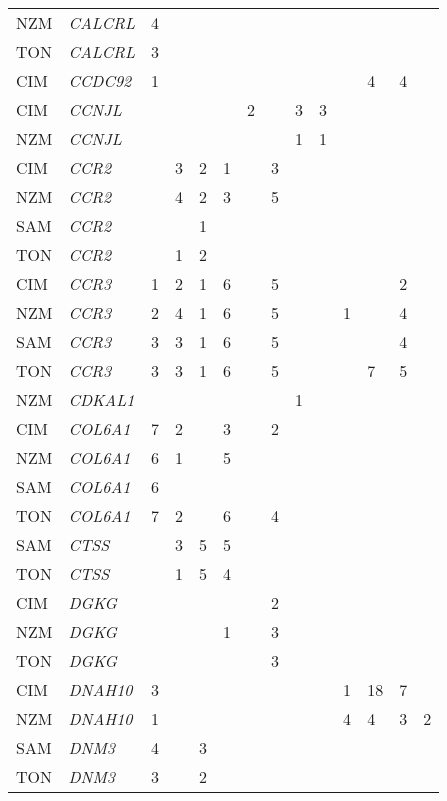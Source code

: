 \documentclass[]{report}
\begin{document}
\begin{ThreePartTable}
\begin{longtable}[t]{llllllllllllll}
NZM & \em{CALCRL} & 4 &  &  &  &  &  &  &  &  &  &  & \\
TON & \em{CALCRL} & 3 &  &  &  &  &  &  &  &  &  &  & \\
CIM & \em{CCDC92} & 1 &  &  &  &  &  &  &  &  & 4 & 4 & \\
CIM & \em{CCNJL} &  &  &  &  & 2 &  & 3 & 3 &  &  &  & \\
NZM & \em{CCNJL} &  &  &  &  &  &  & 1 & 1 &  &  &  & \\
CIM & \em{CCR2} &  & 3 & 2 & 1 &  & 3 &  &  &  &  &  & \\
NZM & \em{CCR2} &  & 4 & 2 & 3 &  & 5 &  &  &  &  &  & \\
SAM & \em{CCR2} &  &  & 1 &  &  &  &  &  &  &  &  & \\
TON & \em{CCR2} &  & 1 & 2 &  &  &  &  &  &  &  &  & \\
CIM & \em{CCR3} & 1 & 2 & 1 & 6 &  & 5 &  &  &  &  & 2 & \\
NZM & \em{CCR3} & 2 & 4 & 1 & 6 &  & 5 &  &  & 1 &  & 4 & \\
SAM & \em{CCR3} & 3 & 3 & 1 & 6 &  & 5 &  &  &  &  & 4 & \\
TON & \em{CCR3} & 3 & 3 & 1 & 6 &  & 5 &  &  &  & 7 & 5 & \\
NZM & \em{CDKAL1} &  &  &  &  &  &  & 1 &  &  &  &  & \\
CIM & \em{COL6A1} & 7 & 2 &  & 3 &  & 2 &  &  &  &  &  & \\
NZM & \em{COL6A1} & 6 & 1 &  & 5 &  &  &  &  &  &  &  & \\
SAM & \em{COL6A1} & 6 &  &  &  &  &  &  &  &  &  &  & \\
TON & \em{COL6A1} & 7 & 2 &  & 6 &  & 4 &  &  &  &  &  & \\
SAM & \em{CTSS} &  & 3 & 5 & 5 &  &  &  &  &  &  &  & \\
TON & \em{CTSS} &  & 1 & 5 & 4 &  &  &  &  &  &  &  & \\
CIM & \em{DGKG} &  &  &  &  &  & 2 &  &  &  &  &  & \\
NZM & \em{DGKG} &  &  &  & 1 &  & 3 &  &  &  &  &  & \\
TON & \em{DGKG} &  &  &  &  &  & 3 &  &  &  &  &  & \\
CIM & \em{DNAH10} & 3 &  &  &  &  &  &  &  & 1 & 18 & 7 & \\
NZM & \em{DNAH10} & 1 &  &  &  &  &  &  &  & 4 & 4 & 3 & 2\\
SAM & \em{DNM3} & 4 &  & 3 &  &  &  &  &  &  &  &  & \\
TON & \em{DNM3} & 3 &  & 2 &  &  &  &  &  &  &  &  & \\

\end{longtable}
\end{ThreePartTable}
\end{document}
